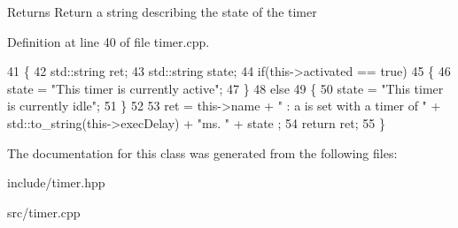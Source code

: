 \begin{DoxyReturn}{Returns}
Return a string describing the state of the timer 
\end{DoxyReturn}


Definition at line 40 of file timer.\+cpp.


\begin{DoxyCode}
41 \{
42     std::string ret;
43     std::string state;
44     \textcolor{keywordflow}{if}(this->activated == \textcolor{keyword}{true})
45     \{
46         state = \textcolor{stringliteral}{"This timer is currently active"};
47     \}
48     \textcolor{keywordflow}{else}
49     \{
50         state = \textcolor{stringliteral}{"This timer is currently idle"};
51     \}
52     
53     ret = this->name + \textcolor{stringliteral}{" : a is set with a timer of "} + std::to\_string(this->execDelay) + \textcolor{stringliteral}{"ms. "} + state ;
54     \textcolor{keywordflow}{return} ret;
55 \}
\end{DoxyCode}


The documentation for this class was generated from the following files\+:\begin{DoxyCompactItemize}
\item 
include/timer.\+hpp\item 
src/timer.\+cpp\end{DoxyCompactItemize}
